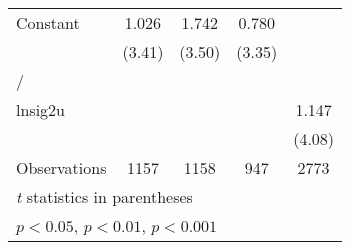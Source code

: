 {\begin{longtable}{l*{4}{c}}
Constant        &    1.026\sym{***}&    1.742\sym{***}&    0.780\sym{***}&                  \\
                &   (3.41)         &   (3.50)         &   (3.35)         &                  \\
\hline
/               &                  &                  &                  &                  \\
lnsig2u         &                  &                  &                  &    1.147\sym{***}\\
                &                  &                  &                  &   (4.08)         \\
\hline
Observations    &     1157         &     1158         &      947         &     2773         \\
\hline\hline
\multicolumn{5}{l}{\footnotesize \textit{t} statistics in parentheses}\\
\multicolumn{5}{l}{\footnotesize \sym{*} \(p<0.05\), \sym{**} \(p<0.01\), \sym{***} \(p<0.001\)}\\
\end{longtable}
}
